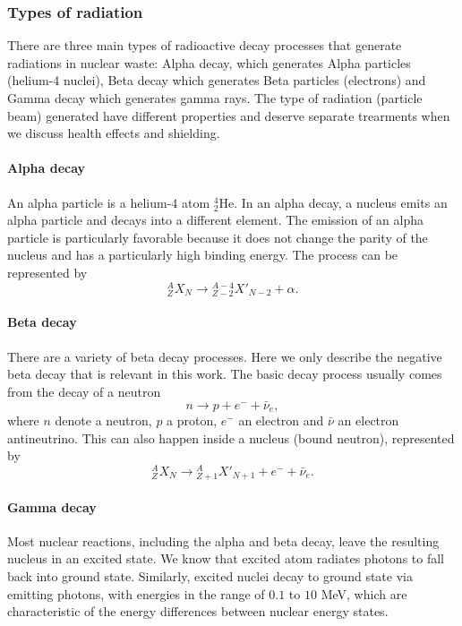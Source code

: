 \documentclass[nofootinbib,preprint,aps]{revtex4-1}
\begin{document}
        \subsubsection{Types of radiation}
        There are three main types of radioactive decay processes that generate radiations in nuclear waste: 
        Alpha decay, which generates Alpha particles (helium-4 nuclei), Beta decay which generates Beta
        particles (electrons) and Gamma decay which generates gamma rays.
        The type of radiation (particle beam) generated
        have different properties and deserve separate trearments when we discuss health effects and shielding.
        \paragraph{Alpha decay}
        An alpha particle is a helium-4 atom ${}^4_2$He. In an alpha decay, a nucleus emits an alpha
        particle and decays into a different element. The emission of an alpha particle is
        particularly favorable because it does not change the parity of the nucleus and has a particularly
        high binding energy. The process can be represented by
        \begin{equation}
            {}^A_Z X_N \rightarrow {}^{A-4}_{Z-2}X'_{N-2} + \alpha.
        \end{equation}

        \paragraph{Beta decay}
        There are a variety of beta decay processes. Here we only describe the negative beta decay that is
        relevant in this work. The basic decay process usually comes from the decay of a neutron
        \begin{equation}
            n \rightarrow p + e^- + \bar{\nu}_e,
        \end{equation}
        where $n$ denote  a neutron, $p$ a proton, $e^-$ an electron and $\bar{\nu}$ an electron antineutrino.
        This can also happen inside a nucleus (bound neutron), represented by
        \begin{equation}
            {}^A_Z X_N \rightarrow {}^A_{Z+1} X'_{N+1} + e^- + \bar{\nu}_e.
        \end{equation}

        \paragraph{Gamma decay}
        Most nuclear reactions, including the alpha and beta decay, leave the resulting nucleus in
        an excited state.
        We know that excited atom radiates photons to fall back into ground state. Similarly, excited nuclei
        decay to ground state via emitting photons, with energies in the range
        of $0.1$ to $10$ MeV, which are characteristic of the energy differences between nuclear energy states.
    
\end{document}
